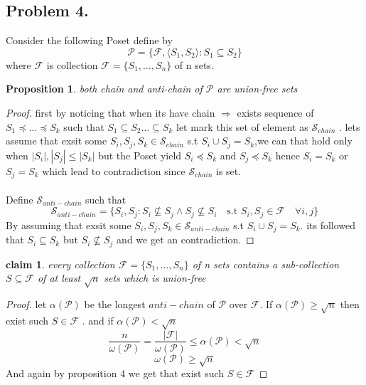 \documentclass[12pt]{article}
\newtheorem*{claim*}{claim}
\newtheorem{prop}{Proposition}
\begin{document}
 \subsection*{Problem 4.}
 Consider the following Poset define by \[\mathcal{P}=\{\mathscr{F},\langle S_1,S_2 \rangle :S_1\subseteq S_2\}
 \] where  $\mathscr{F}$ is collection $\mathscr{F} = \{ S_1, \dots , S_n\}$ of n sets.
 \pagebreak
 \begin{prop} both chain and anti-chain of $\mathcal{P}$  are union-free sets\end{prop}\begin{proof}
first by noticing that when its have chain $\Rightarrow$ exists sequence of $ S_1\preceq \dots \preceq S_{k}$ such that $S_1 \subseteq S_2 \dots \subseteq S_{k}$ let mark this set of element as $\mathcal{S}_{chain}$ .  lets assume that exsit some $S_i,S_j,S_k\in \mathcal{S}_{chain}$ s.t $S_i\cup S_j=S_k$,we can that hold only when $|S_i|,|S_j| \le |S_k|$ but the  Poset yield $S_i\preceq S_k$ and $S_j\preceq S_k$ hence $S_i=S_k$ or $S_j=S_k$ which lead to contradiction  since $\mathcal{S}_{chain}$ is set.\\\\
Define $\mathcal{S}_{anti-chain}$ such that   \[ \mathcal{S}_{anti-chain}=\{S_i,S_j : S_i\nsubseteq  S_j \wedge S_j\nsubseteq  S_i\quad \text{s.t } S_i,S_j \in \mathscr{F}\quad \forall i,j \} \]
 By assuming that exsit some $S_i,S_j,S_k\in \mathcal{S}_{anti-chain}$ s.t $S_i\cup S_j=S_k$. its followed that $S_i\subseteq S_k$ but $S_i\nsubseteq  S_j$ and we get an contradiction.
  \end{proof}

 \begin{claim*}
  every collection $\mathscr{F} = \{ S_1, \dots , S_n\}$ of n sets contains a sub-collection $S \subseteq  \mathscr{F}$ of at least
$\sqrt{n}$ sets which is union-free\end{claim*}
\begin{proof}
let $\alpha (\mathcal{P})$ be the longest $anti-chain$ of $\mathcal{P}$ over $\mathscr{F}$.  If $\alpha (\mathcal{P})\geq \sqrt{n}$ then exist such $S\in \mathscr{F}$
. and if $\alpha (\mathcal{P})< \sqrt{n}$
\[\frac{n}{\omega(\mathcal{P})} =\frac{|\mathscr{F}|}{\omega(\mathcal{P})}\leq \alpha (\mathcal{P})< \sqrt{n}
\]
\[\omega(\mathcal{P}) \geq \sqrt{n}
\]
And again by proposition 4 we get that exist such $S\in \mathscr{F}$

\end{proof}
\end{document}
